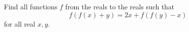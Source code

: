 Find all functions $f$ from the reals to the reals such that
\[ f(f(x) + y) = 2x + f(f(y) - x) \]
for all real $x, y$.
